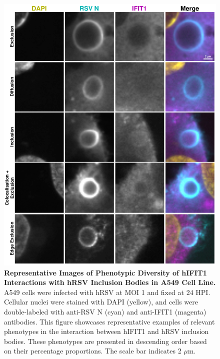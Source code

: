 \begin{figure}
    \centering
    \includegraphics[width=1\linewidth]{08. Chapter 3/Figs/02. Infection/01. IFIT1/03. a549 i1.pdf}
    \caption[Representative Images of Phenotypic Diversity of hIFIT1 Interactions with hRSV Inclusion Bodies in A549 Cell Line.]{\textbf{Representative Images of Phenotypic Diversity of hIFIT1 Interactions with hRSV Inclusion Bodies in A549 Cell Line.} A549 cells were infected with hRSV at MOI 1 and fixed at 24 HPI. Cellular nuclei were stained with DAPI (yellow), and cells were double-labeled with anti-RSV N (cyan) and anti-IFIT1 (magenta) antibodies. This figure showcases representative examples of relevant phenotypes in the interaction between hIFIT1 and hRSV inclusion bodies. These phenotypes are presented in descending order based on their percentage proportions. The scale bar indicates 2 \(\mu \mbox{m}\).}
    \label{fig:Representative Images of Phenotypic Diversity of hIFIT1 Interactions with hRSV Inclusion Bodies in A549 Cell Line}
\end{figure}

